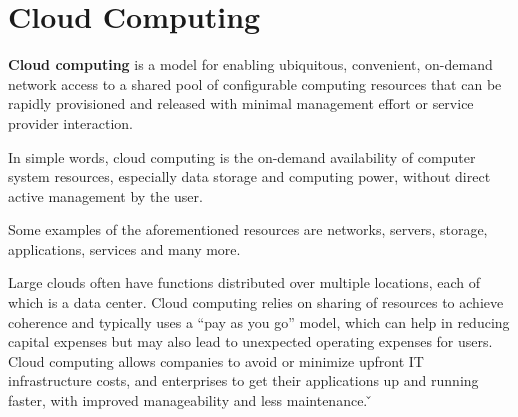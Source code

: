 \section{Cloud Computing}

\textbf{Cloud computing} is a model for enabling ubiquitous, convenient, on-demand network access to a shared pool of
configurable computing resources that can be rapidly provisioned and released with minimal management effort or
service provider interaction.
\ed

In simple words, cloud computing is the on-demand availability of computer system resources, especially data storage
and computing power, without direct active management by the user.

\be Some examples of the aforementioned resources are networks, servers, storage, applications, services and many
more.
\ee

Large clouds often have functions distributed over multiple locations, each of which is a data center. Cloud
computing relies on sharing of resources to achieve coherence and typically uses a ``pay as you go'' model, which can
help in reducing capital expenses but may also lead to unexpected operating expenses for users. Cloud computing
allows companies to avoid or minimize upfront IT infrastructure costs, and enterprises to get their applications up
and running faster, with improved manageability and less maintenance. \v

